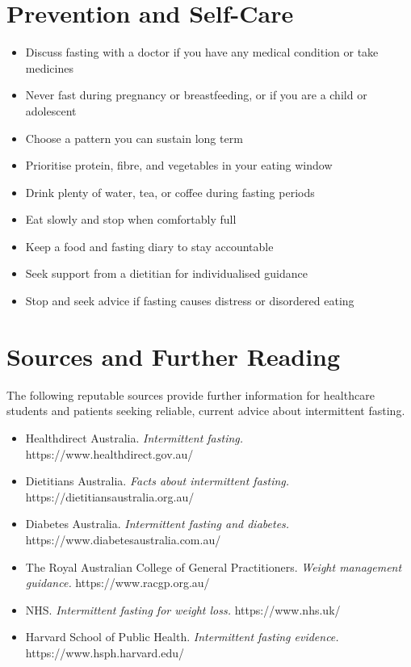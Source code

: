\section*{Prevention and Self-Care}
\begin{itemize}
    \item Discuss fasting with a doctor if you have any medical condition or take medicines
    \item Never fast during pregnancy or breastfeeding, or if you are a child or adolescent
    \item Choose a pattern you can sustain long term
    \item Prioritise protein, fibre, and vegetables in your eating window
    \item Drink plenty of water, tea, or coffee during fasting periods
    \item Eat slowly and stop when comfortably full
    \item Keep a food and fasting diary to stay accountable
    \item Seek support from a dietitian for individualised guidance
    \item Stop and seek advice if fasting causes distress or disordered eating
\end{itemize}

\section*{Sources and Further Reading}
The following reputable sources provide further information for healthcare students and patients seeking reliable, current advice about intermittent fasting.
\begin{itemize}
    \item Healthdirect Australia. \textit{Intermittent fasting.} https://www.healthdirect.gov.au/
    \item Dietitians Australia. \textit{Facts about intermittent fasting.} https://dietitiansaustralia.org.au/
    \item Diabetes Australia. \textit{Intermittent fasting and diabetes.} https://www.diabetesaustralia.com.au/
    \item The Royal Australian College of General Practitioners. \textit{Weight management guidance.} https://www.racgp.org.au/
    \item NHS. \textit{Intermittent fasting for weight loss.} https://www.nhs.uk/
    \item Harvard School of Public Health. \textit{Intermittent fasting evidence.} https://www.hsph.harvard.edu/
\end{itemize}
